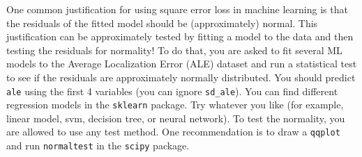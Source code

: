 \documentclass{article}
\newcounter{exercise}
\newcounter{example}[section]
\begin{document}
\begin{exercise}
  One common justification for using square error loss in machine learning is that the residuals of the fitted model should be (approximately) normal. This justification can be approximately tested by fitting a model to the data and then testing the residuals for normality! To do that, you are asked to fit several ML models to the Average Localization Error (ALE) dataset and run a statistical test to see if the residuals are approximately normally distributed. You should predict \texttt{ale} using the first 4 variables (you can ignore \texttt{sd\_ale}). You can find different regression models in the \texttt{sklearn} package. Try whatever you like (for example, linear model, svm, decision tree, or neural network). To test the normality, you are allowed to use any test method. One recommendation is to draw a \texttt{qqplot} and run \texttt{normaltest} in the \texttt{scipy} package.
\end{exercise}
\end{document}
